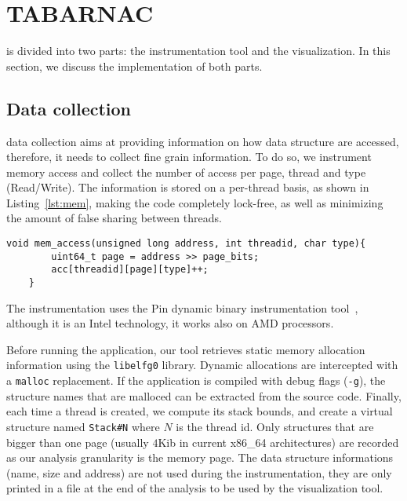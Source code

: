 
\section{TABARNAC}
\label{sec:design}

\TABARNAC is divided into two parts: the instrumentation tool and the
visualization. In this section, we discuss the implementation of both parts.

\subsection{Data collection}
\label{sec:design-impl}

\TABARNAC data collection aims at providing information on how data structure
are accessed, therefore, it needs to collect fine grain information. To do so,
we instrument memory access and collect the number of access per page, thread
and type (Read/Write). The information is stored on a per-thread basis, as
shown in Listing~\ref{lst:mem}, making the code completely lock-free, as well
as minimizing the amount of false sharing between threads.

\begin{lstlisting}[caption={Code executed on each memory access. The \texttt{address}, \texttt{threadid} and \texttt{type} parameters are provided by Pin.},label=lst:mem]
	void mem_access(unsigned long address, int threadid, char type){
		uint64_t page = address >> page_bits;
		acc[threadid][page][type]++;
	}

\end{lstlisting}

The instrumentation uses the Pin dynamic binary instrumentation
tool~\cite{Luk05Pin}, although it is an Intel technology, it works also on AMD
processors.

Before running the application, our tool retrieves static memory allocation
information using the \texttt{libelfg0} library. Dynamic allocations are
intercepted with a \texttt{malloc} replacement. If the application is
compiled with debug flags (\texttt{-g}), the structure names that are malloced can be extracted from the source
code. Finally, each time a thread is created, we compute
its stack bounds, and create a virtual structure named \texttt{Stack\#N} where
$N$ is the thread id. Only structures that are bigger than one page (usually
$4$Kib in current x86\_64 architectures) are recorded as our
analysis granularity is the memory page. The data structure informations (name,
size and address) are not used during the instrumentation, they are only
printed in a file at the end of the analysis to be used by the visualization
tool.

